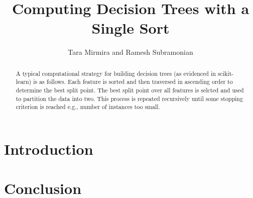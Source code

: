 \documentclass[12pt,letterpaper]{article}
\begin{document}
\title{Computing Decision Trees with a Single Sort}
\author{Tara Mirmira and Ramesh Subramonian}
\maketitle
\thispagestyle{fancy}
\lhead{}
\chead{}
\rhead{}
\lfoot{}
\rfoot{{\small \thepage}}

\begin{abstract}
  A typical computational strategy for building decision trees (as evidenced in
  scikit-learn) is as follows. Each feature is sorted and then traversed in
  ascending order to determine the best split point. The best split point over
  all features is selcted and used to partition the data into two. This
  process is repeated recursively until some stopping criterion is reached e.g., number of instances
  too small. 
\end{abstract}

\section{Introduction}
\TBC

\section{Conclusion}
\TBC


\end{document}
